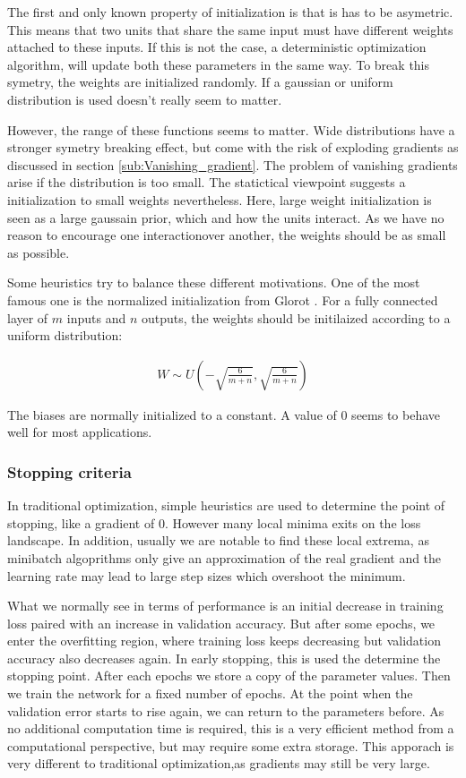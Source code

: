 The first and only known property of initialization is that is has to be
asymetric. This means that two units that share the same input must have
different weights attached to these inputs. If this is not the case, a
deterministic optimization algorithm, will update both these parameters in the
same way. To break this symetry, the weights are initialized randomly. If a
gaussian or uniform distribution is used doesn't really seem to matter.

However, the range of these functions seems to matter. Wide distributions have a
stronger symetry breaking effect, but come with the risk of exploding gradients
as discussed in section \ref{sub:Vanishing_gradient}. The problem of vanishing
gradients arise if the distribution is too small. The statictical viewpoint
suggests a initialization to small weights nevertheless. Here, large weight
initialization is seen as a large gaussain prior, which and how the units
interact. As we have no reason to encourage one interactionover another, the
weights should be as small as possible. 

Some heuristics try to balance these different motivations. One of the most
famous one is the normalized initialization from Glorot
\cite{glorot2010understanding}. For a fully connected layer of $m$ inputs and
$n$ outputs, the weights should be initilaized according to a uniform
distribution:

\begin{align}
    W \sim U(-\sqrt{\frac{6}{m+n}}, \sqrt{\frac{6}{m+n}})
\end{align}

The biases are normally initialized to a constant. A value of 0 seems to behave
well for most applications.




\subsubsection{Stopping criteria}
In traditional optimization, simple heuristics are used to determine the point
of stopping, like a gradient of 0. However many local minima exits on the loss
landscape. In addition, usually we are notable to find these local extrema, as
minibatch algoprithms only give an approximation of the real gradient and the
learning rate may lead to large step sizes which overshoot the minimum.

What we normally see in terms of performance is an initial decrease in training
loss paired with an increase in validation accuracy. But after some epochs, we
enter the overfitting region, where training loss keeps decreasing but
validation accuracy also decreases again. In early stopping, this is used the
determine the stopping point. After each epochs we store a copy of the parameter
values. Then we train the network for a fixed number of epochs. At the point when
the validation error starts to rise again, we can return to the parameters
before. As no additional computation time is required, this is a very efficient
method from a computational perspective, but may require some extra storage.
This apporach is very different to traditional optimization,as gradients may
still be very large.



